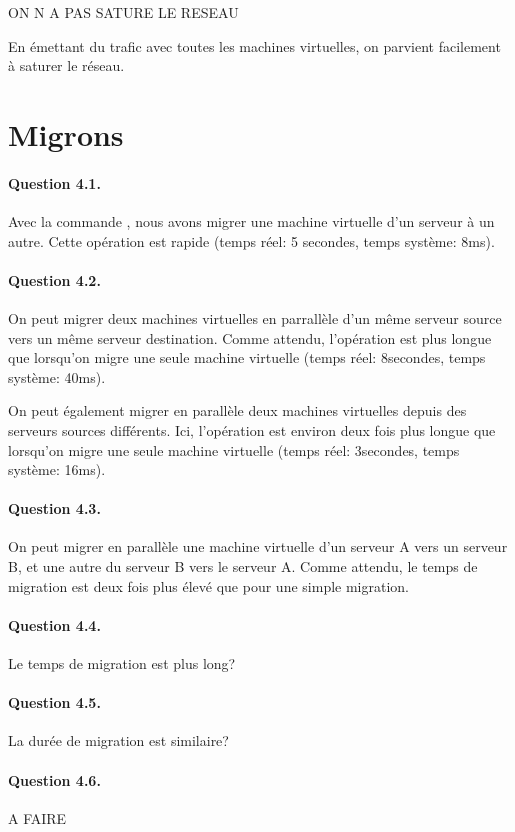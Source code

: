 \documentclass[12pt]{article}
\begin{document}
ON N A PAS SATURE LE RESEAU

En émettant du trafic avec toutes les machines virtuelles, on parvient facilement à saturer le réseau.

\section{Migrons}
\paragraph{Question 4.1.}

Avec la commande , nous avons migrer une machine virtuelle d'un serveur à un autre. Cette opération est rapide (temps réel: 5 secondes, temps système: 8ms).

\paragraph{Question 4.2.}

On peut migrer deux machines virtuelles en parrallèle d'un même serveur source vers un même serveur destination. Comme attendu, l'opération est plus longue que lorsqu'on migre une seule machine virtuelle (temps réel: 8secondes, temps système: 40ms).


On peut également migrer en parallèle deux machines virtuelles depuis des serveurs sources différents. Ici, l'opération est environ deux fois plus longue que lorsqu'on migre une seule machine virtuelle (temps réel: 3secondes, temps système: 16ms).



\paragraph{Question 4.3.}

On peut migrer en parallèle une machine virtuelle d'un serveur A vers un serveur B, et une autre du serveur B vers le serveur A. Comme attendu, le temps de migration est deux fois plus élevé que pour une simple migration.

\paragraph{Question 4.4.}

Le temps de migration est plus long?

\paragraph{Question 4.5.}

La durée de migration est similaire?

\paragraph{Question 4.6.}

A FAIRE
\end{document}
